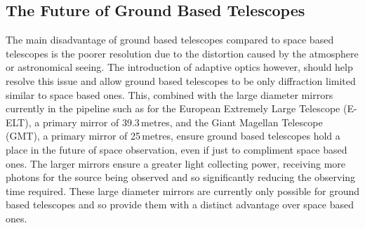 	\subsection{The Future of Ground Based Telescopes} %
	\label{sub:the_future_of_ground_based_telescopes}
		The main disadvantage of ground based telescopes compared to space based telescopes is the poorer resolution due to the distortion caused by the atmosphere or astronomical seeing. The introduction of adaptive optics however, should help resolve this issue and allow ground based telescopes to be only diffraction limited similar to space based ones. This, combined with the large diameter mirrors currently in the pipeline such as for the European Extremely Large Telescope (E-ELT), a primary mirror of 39.3\,metres, and the Giant Magellan Telescope (GMT), a primary mirror of 25\,metres, ensure ground based telescopes hold a place in the future of space observation, even if just to compliment space based ones. The larger mirrors ensure a greater light collecting power, receiving more photons for the source being observed and so significantly reducing the observing time required. These large diameter mirrors are currently only possible for ground based telescopes and so provide them with a distinct advantage over space based ones.

